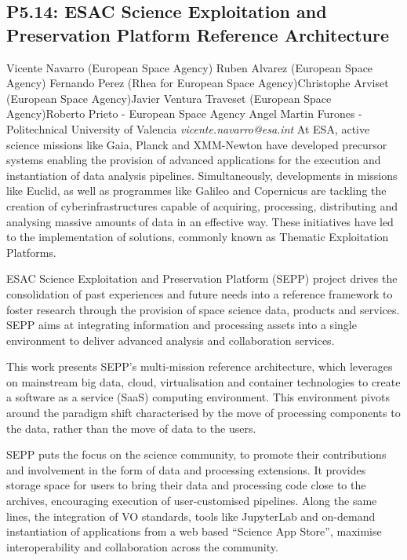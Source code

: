 \documentclass{report}
\begin{document}
\subsection*{P5.14: ESAC Science Exploitation and Preservation Platform Reference Architecture}
\bigskip
Vicente Navarro (European Space Agency) \newline Ruben Alvarez (European Space Agency) \newline  Fernando Perez (Rhea for European Space Agency)\newline  Christophe Arviset (European Space Agency)\newline Javier Ventura Traveset (European Space Agency)\newline  Roberto Prieto - European Space Agency
Angel Martin Furones - Politechnical University of Valencia\newline\newline
{\it vicente.navarro@esa.int}\newline
\newline\newline
At ESA, active science missions like Gaia, Planck and XMM-Newton have developed precursor systems enabling the provision of advanced applications for the execution and instantiation of data analysis pipelines. Simultaneously, developments in missions like Euclid, as well as programmes like Galileo and Copernicus are tackling the creation of cyberinfrastructures capable of acquiring, processing, distributing and analysing massive amounts of data in an effective way. These initiatives have led to the implementation of solutions, commonly known as Thematic Exploitation Platforms.

ESAC Science Exploitation and Preservation Platform (SEPP) project drives the consolidation of past experiences and future needs into a reference framework to foster research through the provision of space science data, products and services. SEPP aims at integrating information and processing assets into a single environment to deliver advanced analysis and collaboration services.

This work presents SEPP’s multi-mission reference architecture, which leverages on mainstream big data, cloud, virtualisation and container technologies to create a software as a service (SaaS) computing environment. This environment pivots around the paradigm shift characterised by the move of processing components to the data, rather than the move of data to the users.  

SEPP puts the focus on the science community, to promote their contributions and involvement in the form of data and processing extensions. It provides storage space for users to bring their data and processing code close to the archives, encouraging execution of user-customised  pipelines. Along the same lines, the integration of VO standards, tools like JupyterLab and on-demand instantiation of applications from a web based “Science App Store”, maximise interoperability and collaboration across the community.\newline
\newpage
\end{document}
